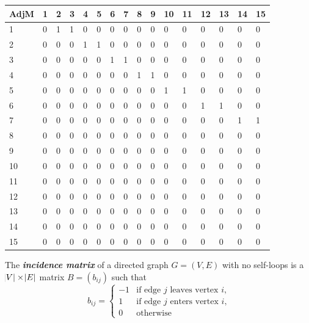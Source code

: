 \documentclass[addpoints,11pt]{exam}
\begin{document}
\begin{questions}
\begin{solutionorbox}
\begin{table}[H]
\begin{tabular}{llllllllllllllll}
\hline
AdjM & 1 & 2 & 3 & 4 & 5 & 6 & 7 & 8 & 9 & 10 & 11 & 12 & 13 & 14 & 15 \\ \hline
1    & 0 & 1 & 1 & 0 & 0 & 0 & 0 & 0 & 0 & 0  & 0  & 0  & 0  & 0  & 0  \\
2    & 0 & 0 & 0 & 1 & 1 & 0 & 0 & 0 & 0 & 0  & 0  & 0  & 0  & 0  & 0  \\
3    & 0 & 0 & 0 & 0 & 0 & 1 & 1 & 0 & 0 & 0  & 0  & 0  & 0  & 0  & 0  \\
4    & 0 & 0 & 0 & 0 & 0 & 0 & 0 & 1 & 1 & 0  & 0  & 0  & 0  & 0  & 0  \\
5    & 0 & 0 & 0 & 0 & 0 & 0 & 0 & 0 & 0 & 1  & 1  & 0  & 0  & 0  & 0  \\
6    & 0 & 0 & 0 & 0 & 0 & 0 & 0 & 0 & 0 & 0  & 0  & 1  & 1  & 0  & 0  \\
7    & 0 & 0 & 0 & 0 & 0 & 0 & 0 & 0 & 0 & 0  & 0  & 0  & 0  & 1  & 1  \\
8    & 0 & 0 & 0 & 0 & 0 & 0 & 0 & 0 & 0 & 0  & 0  & 0  & 0  & 0  & 0  \\
9    & 0 & 0 & 0 & 0 & 0 & 0 & 0 & 0 & 0 & 0  & 0  & 0  & 0  & 0  & 0  \\
10   & 0 & 0 & 0 & 0 & 0 & 0 & 0 & 0 & 0 & 0  & 0  & 0  & 0  & 0  & 0  \\
11   & 0 & 0 & 0 & 0 & 0 & 0 & 0 & 0 & 0 & 0  & 0  & 0  & 0  & 0  & 0  \\
12   & 0 & 0 & 0 & 0 & 0 & 0 & 0 & 0 & 0 & 0  & 0  & 0  & 0  & 0  & 0  \\
13   & 0 & 0 & 0 & 0 & 0 & 0 & 0 & 0 & 0 & 0  & 0  & 0  & 0  & 0  & 0  \\
14   & 0 & 0 & 0 & 0 & 0 & 0 & 0 & 0 & 0 & 0  & 0  & 0  & 0  & 0  & 0  \\
15   & 0 & 0 & 0 & 0 & 0 & 0 & 0 & 0 & 0 & 0  & 0  & 0  & 0  & 0  & 0  \\ \hline
\end{tabular}

\end{table}

\end{solutionorbox}



\pagebreak
\newpage

\question[10]
The \textbf{\textit{incidence matrix}} of a directed graph $G=(V,E)$ with no self-loops is a $\abs{V} \times \abs{E}$ matrix $B = (b_{ij})$ such that
$$b_{ij} = \begin{cases}
	-1 & \text{if edge }j\text{ leaves vertex }i\text{,}\\
	1  & \text{if edge }j\text{ enters vertex }i\text{,}\\
	0  & \text{otherwise}
\end{cases}
$$


\end{questions}
\end{document}
